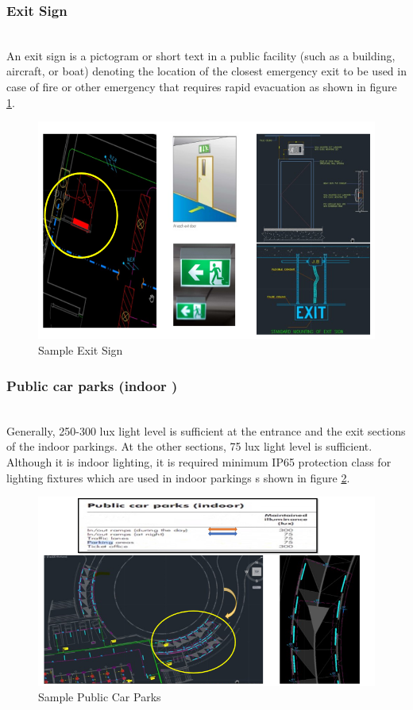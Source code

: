 \documentclass[12pt,fleqn]{book} %
\begin{document}
\subsubsection{Exit Sign }
\\An exit sign is a pictogram or short text in a public facility (such as a building, aircraft, or boat) denoting the location of the closest emergency exit to be used in case of fire or other emergency that requires rapid evacuation as shown in figure \ref{fig:f 8}.
\begin{figure}[!h]
    \centering
    \includegraphics[width=1\linewidth]{f 8.png}
    \caption{Sample Exit Sign}
    \label{fig:f 8}
\end{figure}
\subsubsection{Public car parks (indoor ) }
\\Generally, 250-300 lux light level is sufficient at the entrance and the exit sections of the indoor parkings. At the other sections, 75 lux light level is sufficient. Although it is indoor lighting, it is required minimum IP65 protection class for lighting fixtures which are used in indoor parkings s shown in figure \ref{fig:f 9}. 
\begin{figure}[!h]
    \centering
    \includegraphics[width=1\linewidth]{f 9.png}
    \caption{Sample Public Car Parks}
    \label{fig:f 9}
\end{figure}
\end{document}
